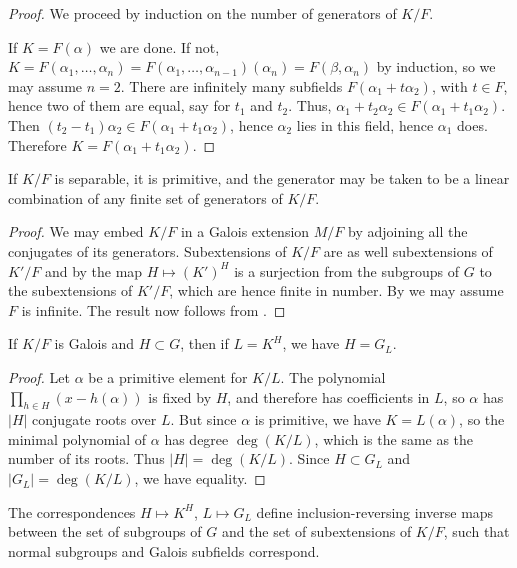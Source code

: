 \begin{proof} We proceed by induction on the number of generators of $K/F$.

If $K = F(\alpha)$ we are done.  If not, $K = F(\alpha_1, \dots, \alpha_n) =
F(\alpha_1, \dots, \alpha_{n - 1})(\alpha_n) = F(\beta, \alpha_n)$ by
induction, so we may assume $n = 2$.  There are infinitely many subfields
$F(\alpha_1 + t \alpha_2)$, with $t \in F$, hence two of them are equal, say for $t_1$ and
$t_2$.  Thus, $\alpha_1 + t_2 \alpha_2 \in F(\alpha_1 + t_1 \alpha_2)$.  Then
$(t_2 - t_1)\alpha_2 \in F(\alpha_1 + t_1 \alpha_2)$, hence $\alpha_2$ lies in
this field, hence $\alpha_1$ does.  Therefore $K = F(\alpha_1 + t_1
\alpha_2)$. \end{proof}

\begin{corollary} If $K/F$ is separable, it is primitive, and the generator may be
taken to be a linear combination of any finite set of generators of $K/F$.
\label{prim_elt}
\end{corollary}

\begin{proof} We may embed $K/F$ in a Galois extension $M/F$ by adjoining all
the conjugates of its generators.  Subextensions of $K/F$ are as well subextensions
of $K'/F$ and by  the map $H \mapsto (K')^H$ is a surjection
from the subgroups of $G$ to the subextensions of $K'/F$, which are hence
finite in number.  By  we may assume $F$ is infinite.  The
result now follows from . \end{proof}

\begin{corollary}
 If $K/F$ is Galois and $H \subset G$, then if $L = K^H$, we have $H = G_L$.
 \label{fixing_subgroup}
\end{corollary}

\begin{proof}
 Let $\alpha$ be a primitive element for $K/L$.  The polynomial $\prod_{h \in H} (x - h(\alpha))$ is fixed by $H$, and therefore has coefficients in $L$, so $\alpha$ has $|H|$ conjugate roots over $L$.  But since $\alpha$ is primitive, we have $K = L(\alpha)$, so the minimal polynomial of $\alpha$ has degree $\deg(K/L)$, which is the same as the number of its roots.  Thus $|H| = \deg(K/L)$.  Since $H \subset G_L$ and $|G_L| = \deg(K/L)$, we have equality.
\end{proof}


\begin{theorem} The correspondences $H \mapsto K^H$, $L \mapsto G_L$ define
inclusion-reversing inverse maps between the set of subgroups of $G$ and the
set of subextensions of $K/F$, such that normal subgroups and Galois subfields
correspond.
\label{fundamental_theorem}
\end{theorem}

